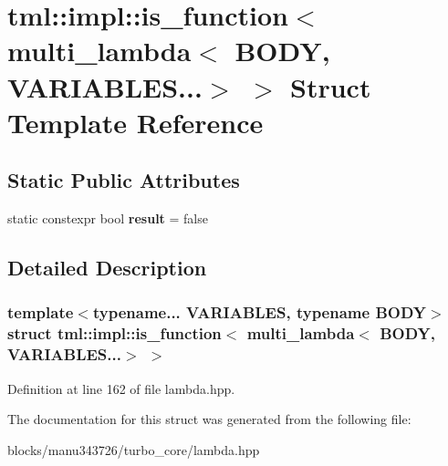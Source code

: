 \hypertarget{structtml_1_1impl_1_1is__function_3_01multi__lambda_3_01_b_o_d_y_00_01_v_a_r_i_a_b_l_e_s_8_8_8_4_01_4}{\section{tml\+:\+:impl\+:\+:is\+\_\+function$<$ multi\+\_\+lambda$<$ B\+O\+D\+Y, V\+A\+R\+I\+A\+B\+L\+E\+S...$>$ $>$ Struct Template Reference}
\label{structtml_1_1impl_1_1is__function_3_01multi__lambda_3_01_b_o_d_y_00_01_v_a_r_i_a_b_l_e_s_8_8_8_4_01_4}
}
\subsection*{Static Public Attributes}
\begin{DoxyCompactItemize}
\item 
\hypertarget{structtml_1_1impl_1_1is__function_3_01multi__lambda_3_01_b_o_d_y_00_01_v_a_r_i_a_b_l_e_s_8_8_8_4_01_4_a7594ddd395d086067a8c8235353b8b5f}{static constexpr bool {\bfseries result} = false}\label{structtml_1_1impl_1_1is__function_3_01multi__lambda_3_01_b_o_d_y_00_01_v_a_r_i_a_b_l_e_s_8_8_8_4_01_4_a7594ddd395d086067a8c8235353b8b5f}

\end{DoxyCompactItemize}


\subsection{Detailed Description}
\subsubsection*{template$<$typename... V\+A\+R\+I\+A\+B\+L\+E\+S, typename B\+O\+D\+Y$>$struct tml\+::impl\+::is\+\_\+function$<$ multi\+\_\+lambda$<$ B\+O\+D\+Y, V\+A\+R\+I\+A\+B\+L\+E\+S...$>$ $>$}



Definition at line 162 of file lambda.\+hpp.



The documentation for this struct was generated from the following file\+:\begin{DoxyCompactItemize}
\item 
blocks/manu343726/turbo\+\_\+core/lambda.\+hpp\end{DoxyCompactItemize}
